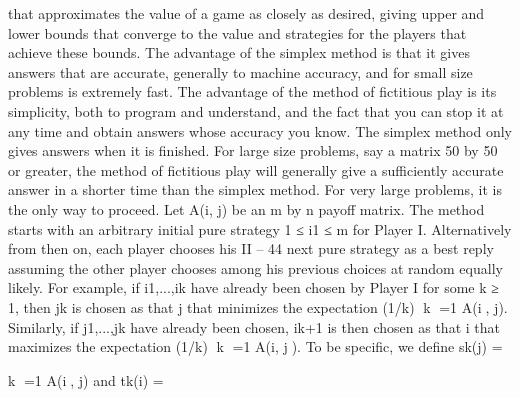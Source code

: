 \documentclass[]{report}
\begin{document}
that approximates the value of a game as closely as desired, giving upper and lower bounds
that converge to the value and strategies for the players that achieve these bounds.
The advantage of the simplex method is that it gives answers that are accurate,
generally to machine accuracy, and for small size problems is extremely fast. The advantage
of the method of fictitious play is its simplicity, both to program and understand, and the
fact that you can stop it at any time and obtain answers whose accuracy you know. The
simplex method only gives answers when it is finished. For large size problems, say a
matrix 50 by 50 or greater, the method of fictitious play will generally give a sufficiently
accurate answer in a shorter time than the simplex method. For very large problems, it is
the only way to proceed.
Let A(i, j) be an m by n payoff matrix. The method starts with an arbitrary initial
pure strategy 1 ≤ i1 ≤ m for Player I. Alternatively from then on, each player chooses his
II – 44
next pure strategy as a best reply assuming the other player chooses among his previous
choices at random equally likely. For example, if i1,...,ik have already been chosen by
Player I for some k ≥ 1, then jk is chosen as that j that minimizes the expectation
(1/k)
k
=1 A(i, j). Similarly, if j1,...,jk have already been chosen, ik+1 is then chosen
as that i that maximizes the expectation (1/k)
k
=1 A(i, j). To be specific, we define
sk(j) = 

k
=1
A(i, j) and tk(i) = 
\end{document}
